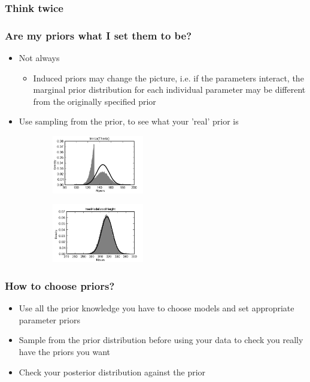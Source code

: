 \subsubsection{Think twice}
\begin{frame}\frametitle{Are my priors what I set them to be?}
	\begin{itemize}
		\item Not always
		\begin{itemize}
			\item Induced priors may change the picture, i.e. if the parameters interact, the marginal prior distribution for each individual parameter may be different from the originally specified prior
		\end{itemize}
		\item Use sampling from the prior, to see what your 'real' prior is
	\end{itemize}
	\begin{figure}[h!]
		\begin{subfigure}[t]{0.4\textwidth}
		{\label{fig:tbmp:a}
		 \includegraphics[width=4cm]{figures/tmrca(Theria)-bw.pdf}
		}
		\end{subfigure}
		\begin{subfigure}[t]{0.4\textwidth}
		{\label{fig:tbmp:b}
		 \includegraphics[width=4cm]{figures/treeModel-rootHeight-bw.pdf}
		}
		\end{subfigure}
  	\end{figure}
\end{frame}

\begin{frame}\frametitle{How to choose priors?}
	\begin{itemize}
		\item Use all the prior knowledge you have to choose models and set appropriate parameter priors
		\item Sample from the prior distribution before using your data to check you really have the priors you want
		\item Check your posterior distribution against the prior%
	\end{itemize}
\end{frame}

